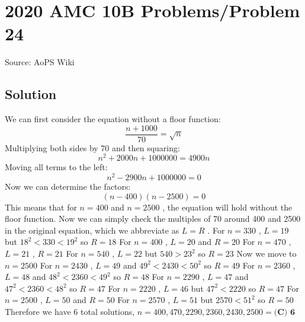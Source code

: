 \documentclass[12pt]{article}
\begin{document}
\section*{{2020 AMC 10B Problems/Problem 24}}
Source: AoPS Wiki

\subsection*{Solution}
We can first consider the equation without a floor function: \[\dfrac{n+1000}{70} = \sqrt{n}\] Multiplying both sides by 70 and then squaring: \[n^2 + 2000n + 1000000 = 4900n\] Moving all terms to the left: \[n^2 - 2900n + 1000000 = 0\] Now we can determine the factors: \[(n-400)(n-2500) = 0\] This means that for $n = 400$ and $n = 2500$ , the equation will hold without the floor function. Now we can simply check the multiples of 70 around 400 and 2500 in the original equation, which we abbreviate as $L=R$ . For $n = 330$ , $L=19$ but $18^2 < 330 < 19^2$ so $R=18$ For $n = 400$ , $L=20$ and $R=20$ For $n = 470$ , $L=21$ , $R=21$ For $n = 540$ , $L=22$ but $540 > 23^2$ so $R=23$ Now we move to $n = 2500$ For $n = 2430$ , $L=49$ and $49^2 < 2430 < 50^2$ so $R=49$ For $n = 2360$ , $L=48$ and $48^2 < 2360 < 49^2$ so $R=48$ For $n = 2290$ , $L=47$ and $47^2 < 2360 < 48^2$ so $R=47$ For $n = 2220$ , $L=46$ but $47^2 < 2220$ so $R=47$ For $n = 2500$ , $L=50$ and $R=50$ For $n = 2570$ , $L=51$ but $2570 < 51^2$ so $R=50$ Therefore we have 6 total solutions, $n = 400, 470, 2290, 2360, 2430, 2500 = \boxed{\textbf{(C) 6}}$
\end{document}
